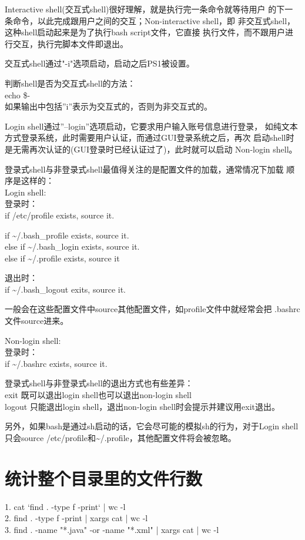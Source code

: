 \documentclass[a4paper,11pt]{article}
\begin{document}
  Interactive shell(交互式shell)很好理解，就是执行完一条命令就等待用户
  的下一条命令，以此完成跟用户之间的交互；Non-interactive shell，即
  非交互式shell，这种shell启动起来是为了执行bash script文件，它直接
  执行文件，而不跟用户进行交互，执行完脚本文件即退出。

  交互式shell通过"-i"选项启动，启动之后PS1被设置。

  判断shell是否为交互式shell的方法：\\
  echo \$-\\
  如果输出中包括''i''表示为交互式的，否则为非交互式的。

  Login shell通过''--login''选项启动，它要求用户输入账号信息进行登录，
  如纯文本方式登录系统，此时需要用户认证，而通过GUI登录系统之后，再次
  启动shell时是无需再次认证的(GUI登录时已经认证过了)，此时就可以启动
  Non-login shell。

  登录式shell与非登录式shell最值得关注的是配置文件的加载，通常情况下加载
  顺序是这样的：\\
  Login shell:\\
  登录时：\\
  if /etc/profile exists, source it.

  if \~{}/.bash\_profile exists, source it.\\
  else if \~{}/.bash\_login exists, source it.\\
  else if \~{}/.profile exists, source it

  退出时：\\
  if \~{}/.bash\_logout exits, source it.

  一般会在这些配置文件中source其他配置文件，如profile文件中就经常会把
  .bashrc文件source进来。

  Non-login shell:\\
  登录时：\\
  if \~{}/.bashrc exists, source it.

  登录式shell与非登录式shell的退出方式也有些差异：\\

  exit 既可以退出login shell也可以退出non-login shell\\
  logout 只能退出login shell，退出non-login shell时会提示并建议用exit退出。

  另外，如果bash是通过sh启动的话，它会尽可能的模拟sh的行为，对于Login shell
  只会source /etc/profile和\~{}/.profile，其他配置文件将会被忽略。


  \section[统计整个目录里的文件行数]{统计整个目录里的文件行数}
  1. cat `find . -type f -print` | wc -l\\
  2. find . -type f -print | xargs cat | wc -l\\
  3. find . -name "*.java" -or -name "*.xml" | xargs cat | wc -l
\end{document}
